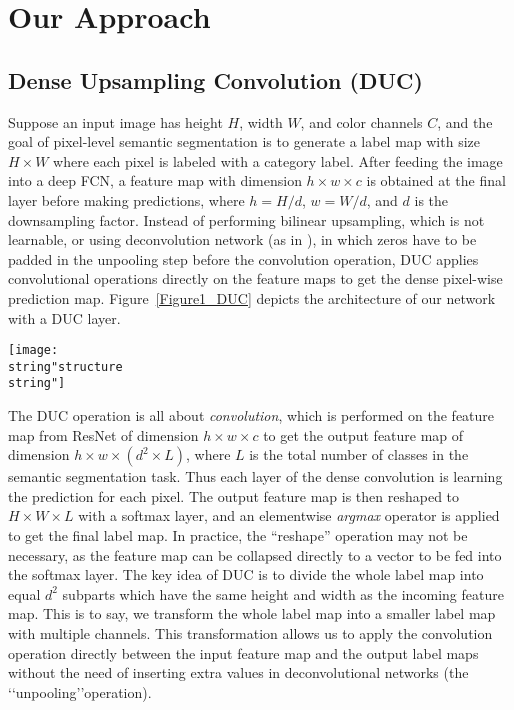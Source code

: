 \documentclass[10pt,twocolumn,letterpaper]{article}
\begin{document}
\section{Our Approach}
\subsection{Dense Upsampling Convolution (DUC)}
Suppose an input image has height $H$, width $W$, and color channels $C$, and the goal of pixel-level semantic segmentation is to generate a label map with size $H\times{W}$ where each pixel is labeled with a category label. After feeding the image into a deep FCN, a feature map with dimension $h\times{w}\times{c}$ is obtained at the final layer before making predictions, where $h=H/d$, $w=W/d$, and $d$ is the downsampling factor. Instead of performing bilinear upsampling, which is not learnable, or using deconvolution network (as in \cite{noh2015learning}), in which zeros have to be padded in the unpooling step before the convolution operation, DUC applies convolutional operations directly on the feature maps to get the dense pixel-wise prediction map. Figure~\ref{Figure1_DUC} depicts the architecture of our network with a DUC layer.

\begin{figure*}[t]
\begin{center}
\texttt{[image: \\string"structure\\string"]}
\end{center}
\caption{Illustration of the architecture of ResNet-101 network with Hybrid Dilated Convolution (HDC) and Dense Upsampling Convolution (DUC) layer. HDC is applied within ResNet blocks, and DUC is applied on top of network and is used for decoding purpose.}
\label{Figure1_DUC}
\vspace{-1pt}
\end{figure*}

The DUC operation is all about \textit{convolution}, which is performed on the feature map from ResNet of dimension $h\times{w}\times{c}$ to get the output feature map of dimension $h\times{w}\times{(d^2\times{L})}$, where $L$ is the total number of classes in the semantic segmentation task. Thus each layer of the dense convolution is learning the prediction for each pixel. The output feature map is then reshaped to $H\times{W}\times{L}$ with a softmax layer, and an elementwise \textit{argmax} operator is applied to get the final label map. In practice, the ``reshape'' operation may not be necessary, as the feature map can be collapsed directly to a vector to be fed into the softmax layer. The key idea of DUC is to divide the whole label map into equal $d^2$ subparts which have the same height and width as the incoming feature map. This is to say, we transform the whole label map into a smaller label map with multiple channels. This transformation allows us to apply the convolution operation directly between the input feature map and the output label maps without the need of inserting extra values in deconvolutional networks (the \lq\lq unpooling\rq\rq operation). 
\end{document}
